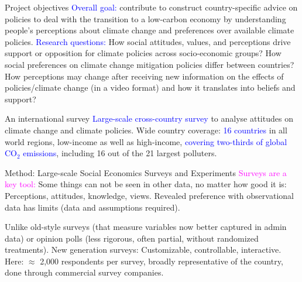 \begin{frame}{Project objectives}
\bbs
\ip \textcolor{blue}{Overall goal:} contribute to construct country-specific advice on policies to deal with the transition to a low-carbon economy by understanding people’s perceptions about climate change and preferences over available climate policies.
\ip \textcolor{blue}{Research questions:}
\bbs
\ip How social attitudes, values, and perceptions drive support or opposition for climate policies across socio-economic groups?
\ip How social preferences on climate change mitigation policies differ between countries?
\ip How perceptions may change after receiving new information on the effects of policies/climate change (in a video format) and how it translates into beliefs and support?
\ee
\ee
\end{frame}

\begin{frame}{An international survey}
\bbvs
\ip \textcolor{blue}{Large-scale cross-country survey} to analyse attitudes on climate change and climate policies.
\ip Wide country coverage:
\bbvs
\ip \textcolor{blue}{16 countries} in all world regions, low-income as well as high-income, 
\ip \textcolor{blue}{covering two-thirds of global CO$_\text{2}$ emissions}, including 16 out of the 21 largest polluters.
\ee
\ee
{}
\end{frame}

\begin{frame}{Method: Large-scale Social Economics Surveys and Experiments}
\bb
\ip \textcolor{magenta}{Surveys are a key tool:}
\bbs 
\ip Some things can not be seen in other data, no matter how good it is: Perceptions, attitudes, knowledge, views.
\ip Revealed preference with observational data has limits (data and assumptions required).

\ip Unlike old-style surveys (that measure variables now better captured in admin data) or opinion polls (less rigorous, often partial, without randomized treatments). 
\ip New generation surveys: Customizable, controllable, interactive.
\ee
\ip Here: $\approx$ 2,000 respondents per survey, broadly representative of the country, done through commercial survey companies. 
\ee
\end{frame}

